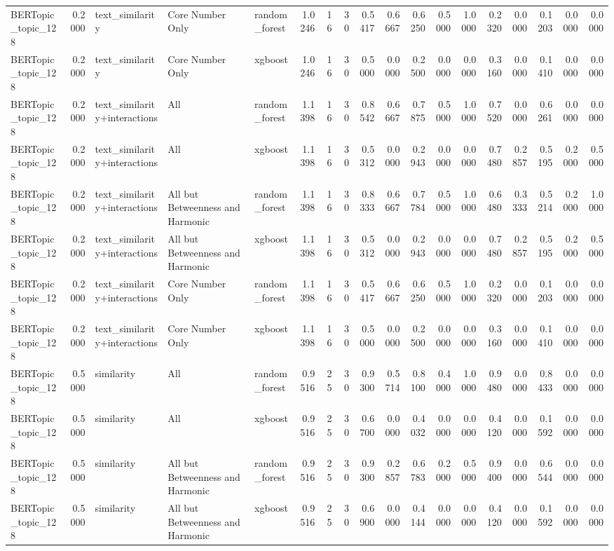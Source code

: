 \begin{tabular}{lrlllrrrrrrrrrrrrr}
BERTopic_topic_128 & 0.2000 & text_similarity & Core Number Only & random_forest & 1.0246 & 16 & 30 & 0.5417 & 0.6667 & 0.6250 & 0.5000 & 1.0000 & 0.2320 & 0.0000 & 0.1203 & 0.0000 & 0.0000 \\
BERTopic_topic_128 & 0.2000 & text_similarity & Core Number Only & xgboost & 1.0246 & 16 & 30 & 0.5000 & 0.0000 & 0.2500 & 0.0000 & 0.0000 & 0.3160 & 0.0000 & 0.1410 & 0.0000 & 0.0000 \\
BERTopic_topic_128 & 0.2000 & text_similarity+interactions & All & random_forest & 1.1398 & 16 & 30 & 0.8542 & 0.6667 & 0.7875 & 0.5000 & 1.0000 & 0.7520 & 0.0000 & 0.6261 & 0.0000 & 0.0000 \\
BERTopic_topic_128 & 0.2000 & text_similarity+interactions & All & xgboost & 1.1398 & 16 & 30 & 0.5312 & 0.0000 & 0.2943 & 0.0000 & 0.0000 & 0.7480 & 0.2857 & 0.5195 & 0.2000 & 0.5000 \\
BERTopic_topic_128 & 0.2000 & text_similarity+interactions & All but Betweenness and Harmonic & random_forest & 1.1398 & 16 & 30 & 0.8333 & 0.6667 & 0.7784 & 0.5000 & 1.0000 & 0.6480 & 0.3333 & 0.5214 & 0.2000 & 1.0000 \\
BERTopic_topic_128 & 0.2000 & text_similarity+interactions & All but Betweenness and Harmonic & xgboost & 1.1398 & 16 & 30 & 0.5312 & 0.0000 & 0.2943 & 0.0000 & 0.0000 & 0.7480 & 0.2857 & 0.5195 & 0.2000 & 0.5000 \\
BERTopic_topic_128 & 0.2000 & text_similarity+interactions & Core Number Only & random_forest & 1.1398 & 16 & 30 & 0.5417 & 0.6667 & 0.6250 & 0.5000 & 1.0000 & 0.2320 & 0.0000 & 0.1203 & 0.0000 & 0.0000 \\
BERTopic_topic_128 & 0.2000 & text_similarity+interactions & Core Number Only & xgboost & 1.1398 & 16 & 30 & 0.5000 & 0.0000 & 0.2500 & 0.0000 & 0.0000 & 0.3160 & 0.0000 & 0.1410 & 0.0000 & 0.0000 \\
BERTopic_topic_128 & 0.5000 & similarity & All & random_forest & 0.9516 & 25 & 30 & 0.9300 & 0.5714 & 0.8100 & 0.4000 & 1.0000 & 0.9480 & 0.0000 & 0.8433 & 0.0000 & 0.0000 \\
BERTopic_topic_128 & 0.5000 & similarity & All & xgboost & 0.9516 & 25 & 30 & 0.6700 & 0.0000 & 0.4032 & 0.0000 & 0.0000 & 0.4120 & 0.0000 & 0.1592 & 0.0000 & 0.0000 \\
BERTopic_topic_128 & 0.5000 & similarity & All but Betweenness and Harmonic & random_forest & 0.9516 & 25 & 30 & 0.9300 & 0.2857 & 0.6783 & 0.2000 & 0.5000 & 0.9400 & 0.0000 & 0.6544 & 0.0000 & 0.0000 \\
BERTopic_topic_128 & 0.5000 & similarity & All but Betweenness and Harmonic & xgboost & 0.9516 & 25 & 30 & 0.6900 & 0.0000 & 0.4144 & 0.0000 & 0.0000 & 0.4120 & 0.0000 & 0.1592 & 0.0000 & 0.0000 \\

\end{tabular}
